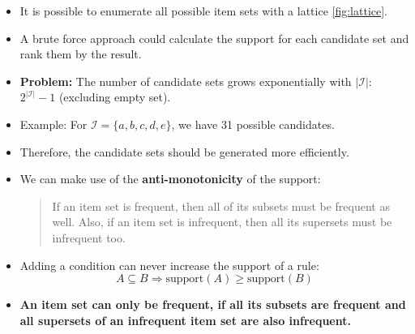 \begin{frame}
	\begin{itemize}
		\item It is possible to enumerate all possible item sets with a lattice \cref{fig:lattice}.
		\item A brute force approach could calculate the support for each candidate set and rank them by the result.
		\item \textbf{Problem:} The number of candidate sets grows exponentially with $\vert \mathcal{I} \vert$: $2^{\vert \mathcal{I} \vert} - 1$ (excluding empty set).
		\item Example: For $\mathcal{I} = \{ a, b, c, d, e \}$, we have 31 possible candidates.
		\item Therefore, the candidate sets should be generated more efficiently.
		\item We can make use of the \textbf{anti-monotonicity} of the support:
		\begin{quote}
			If an item set is frequent, then all of its subsets must be frequent as well. Also, if an item set is infrequent, then all its supersets must be infrequent too.
		\end{quote}
		\item Adding a condition can never increase the support of a rule:
		\begin{equation}
			A \subseteq B \Longrightarrow \text{support}(A) \ge \text{support}(B)
		\end{equation}
		\item \textbf{An item set can only be frequent, if all its subsets are frequent and all supersets of an infrequent item set are also infrequent.}
	\end{itemize}
\end{frame}


